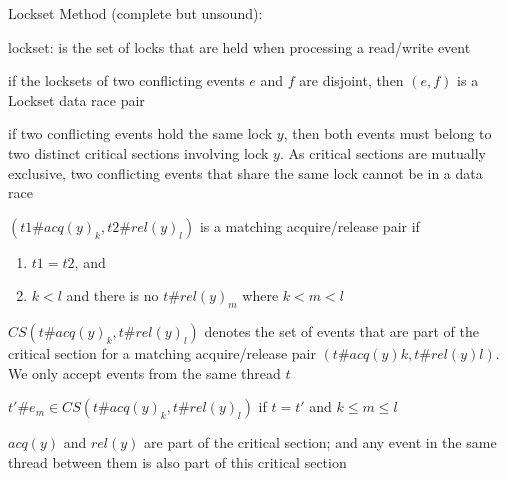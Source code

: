 \documentclass[landscape, a4paper]{article}
\begin{document}
\begin{minipage}[t]{0.2\linewidth}
\begin{betterlist}
\begin{betterlist}
\begin{betterlist}
			\end{betterlist}
		\end{betterlist}
		\item \alert{Lockset Method (complete but unsound)}:
		\begin{betterlist}
			\item \alert{lockset:} is the set of locks that are held when processing a read/write event
			\item if the locksets of two conflicting events $e$ and $f$ are \alert{disjoint}, then $(e, f)$ is a \alert{Lockset data race pair}
			\begin{betterlist}
				\item if two conflicting events hold the same lock $y$, then both events must belong to two distinct critical sections involving lock $y$. As critical sections are mutually exclusive, two conflicting events that share the same lock cannot be in a data race
			\end{betterlist}
			\item $(t1\#acq(y)_k, t2\#rel(y)_l)$ is a matching acquire/release pair if
			\begin{enumerate}
				\item $t1 = t2$, and
				\item $k < l$ and there is no $t\#rel(y)_m$ where $k < m < l$
			\end{enumerate}
			\item $CS(t\#acq(y)_k, t\#rel(y)_l)$ denotes the set of events that are part of the critical section for a matching acquire/release pair $(t\#acq(y)k, t\#rel(y)l)$. We only accept events from the same thread $t$
			\begin{betterlist}
				\item $t'\#e_m \in CS(t\#acq(y)_k, t\#rel(y)_l)$ if $t = t'$ and $k \le m \le l$
				\item $acq(y)$ and $rel(y)$ are part of the critical section; and any event in the same thread between them is also part of this critical section

\end{betterlist}
\end{betterlist}
\end{betterlist}
\end{minipage}
\end{document}
